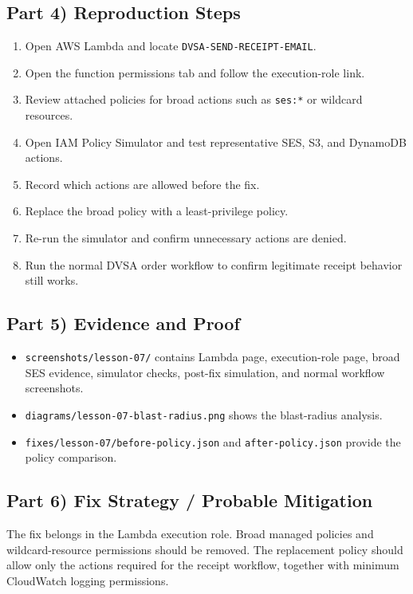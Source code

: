 \documentclass[12pt]{article}
\begin{document}
\subsection*{Part 4) Reproduction Steps}
\begin{enumerate}
\item Open AWS Lambda and locate \texttt{DVSA-SEND-RECEIPT-EMAIL}.
\item Open the function permissions tab and follow the execution-role link.
\item Review attached policies for broad actions such as \texttt{ses:*} or wildcard resources.
\item Open IAM Policy Simulator and test representative SES, S3, and DynamoDB actions.
\item Record which actions are allowed before the fix.
\item Replace the broad policy with a least-privilege policy.
\item Re-run the simulator and confirm unnecessary actions are denied.
\item Run the normal DVSA order workflow to confirm legitimate receipt behavior still works.
\end{enumerate}

\subsection*{Part 5) Evidence and Proof}
\begin{itemize}
\item \texttt{screenshots/lesson-07/} contains Lambda page, execution-role page, broad SES evidence, simulator checks, post-fix simulation, and normal workflow screenshots.
\item \texttt{diagrams/lesson-07-blast-radius.png} shows the blast-radius analysis.
\item \texttt{fixes/lesson-07/before-policy.json} and \texttt{after-policy.json} provide the policy comparison.
\end{itemize}

\subsection*{Part 6) Fix Strategy / Probable Mitigation}
The fix belongs in the Lambda execution role. Broad managed policies and wildcard-resource permissions should be removed. The replacement policy should allow only the actions required for the receipt workflow, together with minimum CloudWatch logging permissions.
\end{document}
